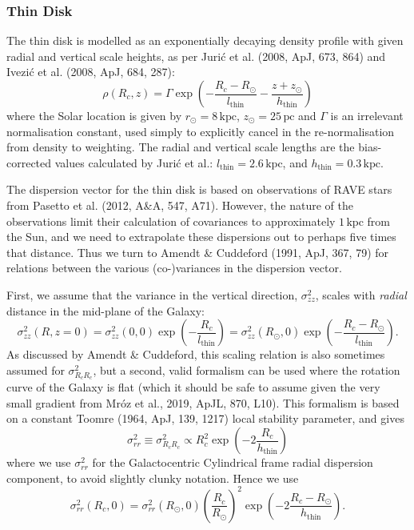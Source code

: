 \documentclass[fleqn,usenatbib]{mnras}
\begin{document}
\subsubsection{Thin Disk}
The thin disk is modelled as an exponentially decaying density profile with given radial and vertical scale heights, as per Juri\'{c} et al. (2008, ApJ, 673, 864) and Ivezi\'{c} et al. (2008, ApJ, 684, 287):
\begin{equation}
    \rho(R_c, z) = \Gamma \exp\left(-\frac{R_c - R_\odot}{l_\mathrm{thin}} - \frac{z + z_\odot}{h_\mathrm{thin}}\right)
\end{equation}
where the Solar location is given by $r_\odot = 8\,\mathrm{kpc}$, $z_\odot = 25\,\mathrm{pc}$ and $\Gamma$ is an irrelevant normalisation constant, used simply to explicitly cancel in the re-normalisation from density to weighting.
The radial and vertical scale lengths are the bias-corrected values calculated by Juri\'{c} et al.: $l_\mathrm{thin} = 2.6\,\mathrm{kpc}$, and $h_\mathrm{thin} = 0.3\,\mathrm{kpc}$.

The dispersion vector for the thin disk is based on observations of RAVE stars from Pasetto et al. (2012, A\&A, 547, A71).
However, the nature of the observations limit their calculation of covariances to approximately $1\,\mathrm{kpc}$ from the Sun, and we need to extrapolate these dispersions out to perhaps five times that distance.
Thus we turn to Amendt \& Cuddeford (1991, ApJ, 367, 79) for relations between the various (co-)variances in the dispersion vector.

First, we assume that the variance in the vertical direction, $\sigma_{zz}^2$, scales with \textit{radial} distance in the mid-plane of the Galaxy:
\begin{equation}
    \sigma_{zz}^2(R, z=0) = \sigma_{zz}^2(0, 0) \exp\left(-\frac{R_c}{l_\mathrm{thin}}\right) = \sigma_{zz}^2(R_\odot, 0) \exp\left(-\frac{R_c - R_\odot}{l_\mathrm{thin}}\right).
\end{equation}
As discussed by Amendt \& Cuddeford, this scaling relation is also sometimes assumed for $\sigma_{R_cR_c}^2$, but a second, valid formalism can be used where the rotation curve of the Galaxy is flat (which it should be safe to assume given the very small gradient from Mr\'{o}z et al., 2019, ApJL, 870, L10).
This formalism is based on a constant Toomre (1964, ApJ, 139, 1217) local stability parameter, and gives
\begin{equation}
    \sigma_{rr}^2 \equiv \sigma_{R_cR_c}^2 \propto R_c^2 \exp\left(-2\frac{R_c}{h_\mathrm{thin}}\right)
\end{equation}
where we use $\sigma_{rr}^2$ for the Galactocentric Cylindrical frame radial dispersion component, to avoid slightly clunky notation.
Hence we use
\begin{equation}
    \sigma_{rr}^2(R_c, 0) = \sigma_{rr}^2(R_\odot, 0) \left(\frac{R_c}{R_\odot}\right)^2 \exp\left(-2\frac{R_c - R_\odot}{h_\mathrm{thin}}\right).
\end{equation}
\end{document}
